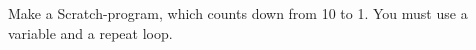     Make a Scratch-program, which counts down from 10 to 1. You must use a
    variable and a repeat loop.